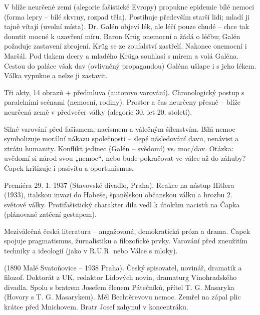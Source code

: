 \documentclass[FGBook.tex]{subfiles}
\begin{document}
\noindent V blíže neurčené zemi (alegorie fašistické Evropy) propukne epidemie bílé nemoci (forma lepry – bílé skvrny, rozpad těla). Postihuje především starší lidi; mladí ji tajně vítají (uvolní místa). Dr. Galén objeví lék, ale léčí pouze chudé – chce tak donutit mocné k uzavření míru. Baron Krüg onemocní a žádá o léčbu; Galén požaduje zastavení zbrojení. Krüg se ze zoufalství zastřelí. Nakonec onemocní i Maršál. Pod tlakem dcery a mladého Krüga souhlasí s mírem a volá Galéna. Cestou do paláce však dav (ovlivněný propagandou) Galéna ušlape i s jeho lékem. Válka vypukne a nelze ji zastavit.

\noindent Tři akty, 14 obrazů + předmluva (autorovo varování). Chronologický postup s paralelními scénami (nemocní, rodiny). Prostor a čas neurčeny přesně – blíže neurčená země v předvečer války (alegorie 30. let 20. století).

\noindent Silné varování před fašismem, nacismem a válečným šílenstvím. Bílá nemoc symbolizuje morální nákazu společnosti – slepé následování davu, nenávist a ztrátu humanity. Konflikt jedinec (Galén – svědomí) vs. moc/dav. Otázka: uvědomí si národ svou „nemoc“, nebo bude pokračovat ve válce až do záhuby? Čapek kritizuje i pasivitu a oportunismus.

\vspace*{2em}

\noindent Premiéra 29. 1. 1937 (Stavovské divadlo, Praha). Reakce na nástup Hitlera (1933), italskou invazi do Habeše, španělskou občanskou válku a hrozbu 2. světové války. Protifašistický charakter díla vedl k útokům nacistů na Čapka (plánované zatčení gestapem).

\noindent Meziválečná česká literatura – angažovaná, demokratická próza a drama. Čapek spojuje pragmatismus, žurnalistiku a filozofické prvky. Varování před zneužitím techniky a ideologií (jako v R.U.R. nebo Válce s mloky).

\noindent (1890 Malé Svatoňovice – 1938 Praha). Český spisovatel, novinář, dramatik a filozof. Doktorát z UK, redaktor Lidových novin, dramaturg Vinohradského divadla. Spolu s bratrem Josefem členem Pátečníků, přítel T. G. Masaryka (Hovory s T. G. Masarykem). Měl Bechtěrevovu nemoc. Zemřel na zápal plic krátce před Mnichovem. Bratr Josef zahynul v koncentráku.
\end{document}
